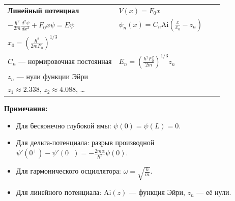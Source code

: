 \documentclass[a4paper, 12pt]{article}
\begin{document}
\begin{table}[h!]
\begin{tabular}{>{\raggedright\arraybackslash}p{3.5cm} >{\raggedright\arraybackslash}p{4.5cm} >{\raggedright\arraybackslash}p{4.5cm} >{\raggedright\arraybackslash}p{4cm}}
			\textbf{Линейный потенциал}
			&
			$V(x) = F_0x$ \\
			$-\frac{\hbar^2}{2m}\frac{d^2\psi}{dx^2} + F_0x\psi = E\psi$
			&
			$\psi_n(x) = C_n\mathrm{Ai}\left(\frac{x}{x_0} - z_n\right)$ \\
			$x_0 = \left(\frac{\hbar^2}{2mF_0}\right)^{1/3}$ \\
			$C_n$ — нормировочная постоянная
			&
			$E_n = \left(\frac{\hbar^2 F_0^2}{2m}\right)^{1/3}z_n$ \\
			$z_n$ — нули функции Эйри \\
			$z_1 \approx 2.338$, $z_2 \approx 4.088$, \ldots \\
			\bottomrule
		\end{tabular}
	\end{table}%

	\noindent \textbf{Примечания:}
	\begin{itemize}
		\item Для бесконечно глубокой ямы: $\psi(0) = \psi(L) = 0$.
		\item Для дельта-потенциала: разрыв производной $\psi'(0^+) - \psi'(0^-) = -\frac{2m\alpha}{\hbar^2}\psi(0)$.
		\item Для гармонического осциллятора: $\omega = \sqrt{\frac{k}{m}}$.
		\item Для линейного потенциала: $\mathrm{Ai}(z)$ — функция Эйри, $z_n$ — её нули.
	\end{itemize}
	
\end{document}

